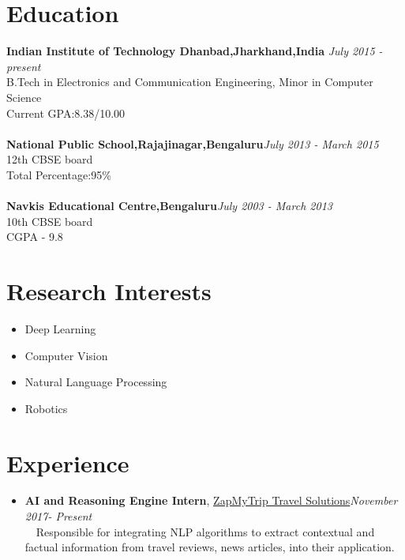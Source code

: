 \documentclass[margin, centered]{res}
\begin{document}
\begin{resume}

\section{\textbf{Education}}

\textbf{Indian Institute of Technology Dhanbad,Jharkhand,India} \hfill\textit{ July 2015 - present}\\
B.Tech in Electronics and Communication Engineering, Minor in Computer Science\\
Current GPA:8.38/10.00\\ \\
\textbf{National Public School,Rajajinagar,Bengaluru}\hfill\textit{July 2013 - March 2015}\\
12th CBSE board\\
Total Percentage:95\%\\ \\
\textbf{Navkis Educational Centre,Bengaluru}\hfill\textit{July 2003 - March 2013}\\
10th CBSE board\\
CGPA - 9.8\\

\section{\textbf{Research Interests}}
\begin{itemize}
\item Deep Learning
\item Computer Vision
\item Natural Language Processing
\item Robotics
\end{itemize}

\section{\textbf{Experience}}
\begin{itemize}
\item \textbf{AI and Reasoning Engine Intern}, \href{https://www.voyazer.net/}{ZapMyTrip Travel Solutions}\hfill\textit{November 2017- Present}\\
~\textbullet~Responsible for integrating NLP algorithms to extract contextual and factual information from travel reviews, news articles, into their application.
\end{itemize}


\end{resume}
\end{document}
